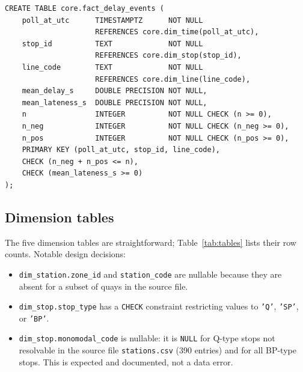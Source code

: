 \documentclass[a4paper,11pt]{article}
\begin{document}
\begin{lstlisting}[style=sql, caption={Fact table DDL (\texttt{sql/schema/02\_core.sql}).}]
CREATE TABLE core.fact_delay_events (
    poll_at_utc      TIMESTAMPTZ      NOT NULL
                     REFERENCES core.dim_time(poll_at_utc),
    stop_id          TEXT             NOT NULL
                     REFERENCES core.dim_stop(stop_id),
    line_code        TEXT             NOT NULL
                     REFERENCES core.dim_line(line_code),
    mean_delay_s     DOUBLE PRECISION NOT NULL,
    mean_lateness_s  DOUBLE PRECISION NOT NULL,
    n                INTEGER          NOT NULL CHECK (n >= 0),
    n_neg            INTEGER          NOT NULL CHECK (n_neg >= 0),
    n_pos            INTEGER          NOT NULL CHECK (n_pos >= 0),
    PRIMARY KEY (poll_at_utc, stop_id, line_code),
    CHECK (n_neg + n_pos <= n),
    CHECK (mean_lateness_s >= 0)
);
\end{lstlisting}

\subsection{Dimension tables}

The five dimension tables are straightforward; Table~\ref{tab:tables} lists their
row counts.
Notable design decisions:
\begin{itemize}
  \item \texttt{dim\_station.zone\_id} and \texttt{station\_code} are nullable
    because they are absent for a subset of quays in the source file.
  \item \texttt{dim\_stop.stop\_type} has a \texttt{CHECK} constraint restricting
    values to \texttt{'Q'}, \texttt{'SP'}, or \texttt{'BP'}.
  \item \texttt{dim\_stop.monomodal\_code} is nullable: it is \texttt{NULL} for
    Q-type stops not resolvable in the source file \texttt{stations.csv} (390 entries) and for
    all BP-type stops.
    This is expected and documented, not a data error.
\end{itemize}
\end{document}
